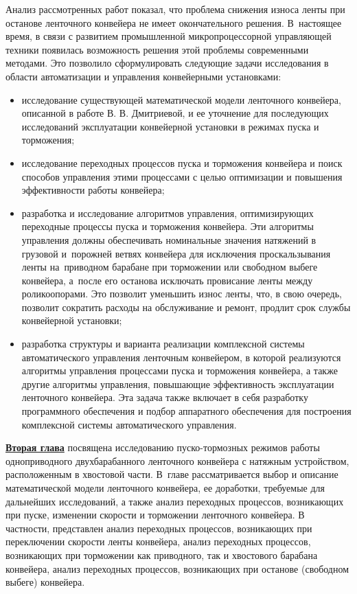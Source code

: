 Анализ рассмотренных работ показал, что проблема снижения износа ленты при останове ленточного конвейера не имеет окончательного решения. В~настоящее время, в связи с развитием промышленной микропроцессорной управляющей техники появилась возможность решения этой проблемы современными методами. Это позволило сформулировать следующие задачи исследования в области автоматизации и управления конвейерными установками:
\begin{itemize}
	\item исследование существующей математической модели ленточного конвейера, описанной в работе В. В. Дмитриевой, и ее уточнение для последующих исследований эксплуатации конвейерной установки в режимах пуска и торможения;
	\item исследование переходных процессов пуска и торможения конвейера и поиск способов управления этими процессами с целью оптимизации и повышения эффективности работы конвейера;
	\item разработка и исследование алгоритмов управления, оптимизирующих переходные процессы пуска и торможения конвейера. Эти алгоритмы управления должны обеспечивать номинальные значения натяжений в грузовой и~порожней ветвях конвейера для исключения проскальзывания ленты на~приводном барабане при торможении или свободном выбеге конвейера, а~после его останова исключать провисание ленты между роликоопорами. Это позволит уменьшить износ ленты, что, в свою очередь, позволит сократить расходы на обслуживание и ремонт, продлит срок службы конвейерной установки;
	\item разработка структуры и варианта реализации комплексной системы автоматического управления ленточным конвейером, в которой реализуются алгоритмы управления процессами пуска и торможения конвейера, а также другие алгоритмы управления, повышающие эффективность эксплуатации ленточного конвейера. Эта задача также включает в себя разработку программного обеспечения и подбор аппаратного обеспечения для построения комплексной системы автоматического управления.
\end{itemize}

\underline{\textbf{Вторая глава}} посвящена исследованию пуско-тормозных режимов работы одноприводного двухбарабанного ленточного конвейера с натяжным устройством, расположенным в хвостовой части. В~главе рассматривается выбор и описание математической модели ленточного конвейера, ее доработки, требуемые для дальнейших исследований, а также анализ переходных процессов, возникающих при пуске, изменении скорости и торможении ленточного конвейера. В частности, представлен анализ переходных процессов, возникающих при переключении скорости ленты конвейера, анализ переходных процессов, возникающих при торможении как приводного, так и хвостового барабана конвейера, анализ переходных процессов, возникающих при останове (свободном выбеге) конвейера.

